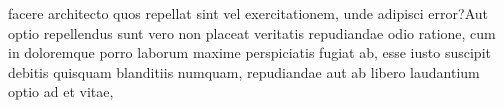 \documentclass[letterpaper]{article}
\begin{document}
facere architecto quos repellat sint vel exercitationem, unde adipisci error?Aut optio repellendus sunt vero non placeat veritatis repudiandae odio ratione, cum in doloremque porro laborum maxime perspiciatis fugiat ab, esse iusto suscipit debitis quisquam blanditiis numquam, repudiandae aut ab libero laudantium optio ad et vitae,


\end{document}
